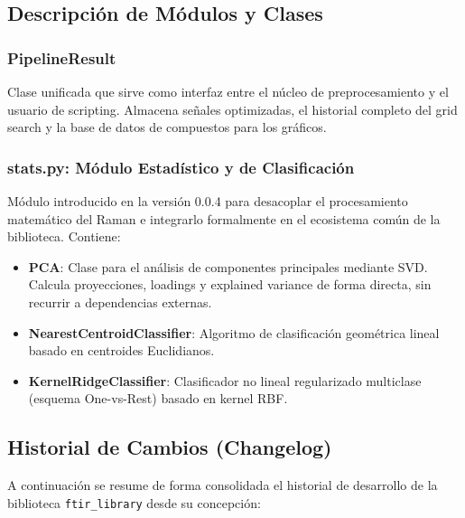 \subsection{Descripción de Módulos y Clases}

\subsubsection{PipelineResult}
Clase unificada que sirve como interfaz entre el núcleo de preprocesamiento y el usuario de scripting. Almacena señales optimizadas, el historial completo del grid search y la base de datos de compuestos para los gráficos.

\subsubsection{stats.py: Módulo Estadístico y de Clasificación}
Módulo introducido en la versión 0.0.4 para desacoplar el procesamiento matemático del Raman e integrarlo formalmente en el ecosistema común de la biblioteca. Contiene:
\begin{itemize}
    \item \textbf{PCA}: Clase para el análisis de componentes principales mediante SVD. Calcula proyecciones, loadings y explained variance de forma directa, sin recurrir a dependencias externas.
    \item \textbf{NearestCentroidClassifier}: Algoritmo de clasificación geométrica lineal basado en centroides Euclidianos.
    \item \textbf{KernelRidgeClassifier}: Clasificador no lineal regularizado multiclase (esquema One-vs-Rest) basado en kernel RBF.
\end{itemize}

\subsection{Historial de Cambios (Changelog)}
A continuación se resume de forma consolidada el historial de desarrollo de la biblioteca \texttt{ftir\_library} desde su concepción:

